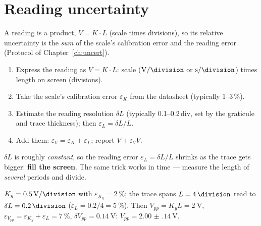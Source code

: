 \documentclass[11pt,a4paper,oneside]{book}
\begin{document}
\section{Reading uncertainty}
A reading is a product, $V=K\cdot L$ (scale times divisions), so its relative
uncertainty is the \emph{sum} of the scale's calibration error and the reading
error (Protocol of Chapter~\ref{ch:uncert}).

\begin{protocol}
\begin{enumerate}[leftmargin=1.5cm]
  \item Express the reading as $V=K\cdot L$: scale ($\unit{\volt\per\division}$ or
        $\unit{\second\per\division}$) times length on screen (divisions).
  \item Take the scale's calibration error $\varepsilon_K$ from the datasheet
        (typically 1--3\,\%).
  \item Estimate the reading resolution $\delta L$ (typically
        0.1--0.2\,div, set by the graticule and trace thickness); then
        $\varepsilon_L=\delta L/L$.
  \item Add them: $\varepsilon_V=\varepsilon_K+\varepsilon_L$; report
        $V\pm\varepsilon_V V$.
\end{enumerate}
\end{protocol}

\begin{keyidea}
$\delta L$ is roughly \emph{constant}, so the reading error
$\varepsilon_L=\delta L/L$ shrinks as the trace gets bigger: \textbf{fill the
screen}. The same trick works in time --- measure the length of \emph{several}
periods and divide.
\end{keyidea}

\begin{wexample}
$K_y=\qty{0.5}{\volt\per\division}$ with $\varepsilon_{K_y}=\qty{2}{\percent}$; the trace
spans $L=\qty{4}{\division}$ read to $\delta L=\qty{0.2}{\division}$
($\varepsilon_L=0.2/4=\qty{5}{\percent}$). Then $V_{pp}=K_yL=\qty{2}{\volt}$,
$\varepsilon_{V_{pp}}=\varepsilon_{K_y}+\varepsilon_L=\qty{7}{\percent}$,
$\delta V_{pp}=\qty{0.14}{\volt}$: $V_{pp}=\qty{2.00(14)}{\volt}$.
\end{wexample}
\end{document}
